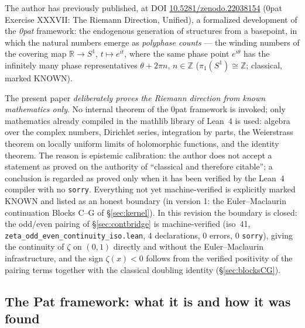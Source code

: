 \documentclass{article}
\newcommand{\R}{\mathbb{R}}
\newcommand{\Z}{\mathbb{Z}}
\newcommand{\zt}{\zeta}
\begin{document}
The author has previously published, at DOI
\href{https://doi.org/10.5281/zenodo.22038154}{10.5281/zenodo.22038154}
(0pat Exercise XXXVII: The Riemann Direction, Unified), a formalized
development of the \emph{0pat} framework: the endogenous generation of
structures from a basepoint, in which the natural numbers emerge as
\emph{polyphase counts} --- the winding numbers of the covering map
$\R\to S^1$, $t\mapsto e^{it}$, where the same phase point $e^{i\theta}$ has
the infinitely many phase representatives $\theta+2\pi n$, $n\in\Z$
($\pi_1(S^1)\cong\Z$; classical, marked KNOWN).

The present paper \emph{deliberately proves the Riemann direction from known
mathematics only}. No internal theorem of the 0pat framework is invoked;
only mathematics already compiled in the mathlib library of Lean~4 is used:
algebra over the complex numbers, Dirichlet series, integration by parts, the
Weierstrass theorem on locally uniform limits of holomorphic functions, and
the identity theorem. The reason is epistemic calibration: the author does
not accept a statement as proved on the authority of ``classical and
therefore citable''; a conclusion is regarded as proved only when it has been
verified by the Lean~4 compiler with no \texttt{sorry}. Everything not yet
machine-verified is explicitly marked KNOWN and listed as an honest boundary
(in version 1: the Euler--Maclaurin continuation Blocks C--G of
\S\ref{sec:kernel}). In this revision the boundary is closed: the odd/even
pairing of \S\ref{sec:contbridge} is machine-verified (iso~41,
\texttt{zeta\_odd\_even\_continuity\_iso.lean}, 4 declarations, 0 errors,
0 \texttt{sorry}), giving the continuity of $\zt$ on $(0,1)$ directly and
without the Euler--Maclaurin infrastructure, and the sign $\zt(x)<0$ follows
from the verified positivity of the pairing terms together with the
classical doubling identity (\S\ref{sec:blocksCG}).

\subsection{The Pat framework: what it is and how it was found}
\label{sec:pat}
\end{document}
